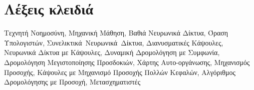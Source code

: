 
\section*{Λέξεις κλειδιά}

\noindent
Τεχνητή Νοημοσύνη, Μηχανική Μάθηση, Βαθιά Νευρωνικά Δίκτυα, Όραση Υπολογιστών, \mbox{Συνελικτικά Νευρωνικά Δίκτυα}, Διανυσματικές Κάψουλες, Νευρωνικά Δίκτυα με Κάψουλες, Δυναμική Δρομολόγηση με Συμφωνία, Δρομολόγηση Μεγιστοποίησης Προσδοκιών, Χάρτης Αυτο-οργάνωσης, Μηχανισμός Προσοχής, Κάψουλες με Μηχανισμό Προσοχής Πολλών \mbox{Κεφαλών}, Αλγόριθμος Δρομολόγησης με Προσοχή, Μετασχηματιστές

